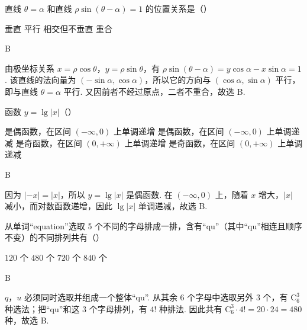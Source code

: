 \begin{problem}
直线 \(\theta=\alpha\) 和直线 \(\rho\sin\left(\theta-\alpha\right)=1\) 的位置关系是（\quad）

\choices
    {垂直}
    {平行}
    {相交但不垂直}
    {重合}
\end{problem}

\begin{answer}
B
\end{answer}

\begin{solution}
由极坐标关系 \(x=\rho\cos\theta\)，\(y=\rho\sin\theta\)，有 \(\rho\sin\left(\theta-\alpha\right)=y\cos\alpha-x\sin\alpha=1\). 该直线的法向量为 \((-\sin\alpha,\cos\alpha)\)，所以它的方向与 \((\cos\alpha,\sin\alpha)\) 平行，即与直线 \(\theta=\alpha\) 平行. 又因前者不经过原点，二者不重合，故选 B.
\end{solution}

\begin{problem}
函数 \(y=\lg|x|\)（\quad）

\choices
    {是偶函数，在区间 \((-\infty,0)\) 上单调递增}
    {是偶函数，在区间 \((-\infty,0)\) 上单调递减}
    {是奇函数，在区间 \((0,+\infty)\) 上单调递增}
    {是奇函数，在区间 \((0,+\infty)\) 上单调递减}
\end{problem}

\begin{answer}
B
\end{answer}

\begin{solution}
因为 \(|-x|=|x|\)，所以 \(y=\lg|x|\) 是偶函数. 在 \((-\infty,0)\) 上，随着 \(x\) 增大，\(|x|\) 减小，而对数函数递增，因此 \(\lg|x|\) 单调递减，故选 B.
\end{solution}

\begin{problem}
从单词“equation”选取 5 个不同的字母排成一排，含有“qu”（其中“qu”相连且顺序不变）的不同排列共有（\quad）

\choices
    {\(120\) 个}
    {\(480\) 个}
    {\(720\) 个}
    {\(840\) 个}
\end{problem}

\begin{answer}
B
\end{answer}

\begin{solution}
\(q\)，\(u\) 必须同时选取并组成一个整体“qu”. 从其余 \(6\) 个字母中选取另外 \(3\) 个，有 \(\mathrm C_{6}^{3}\) 种选法；把“qu”和这 \(3\) 个字母排列，有 \(4!\) 种排法. 因此共有 \(\mathrm C_{6}^{3}\cdot4!=20\cdot24=480\) 种，故选 B.
\end{solution}

